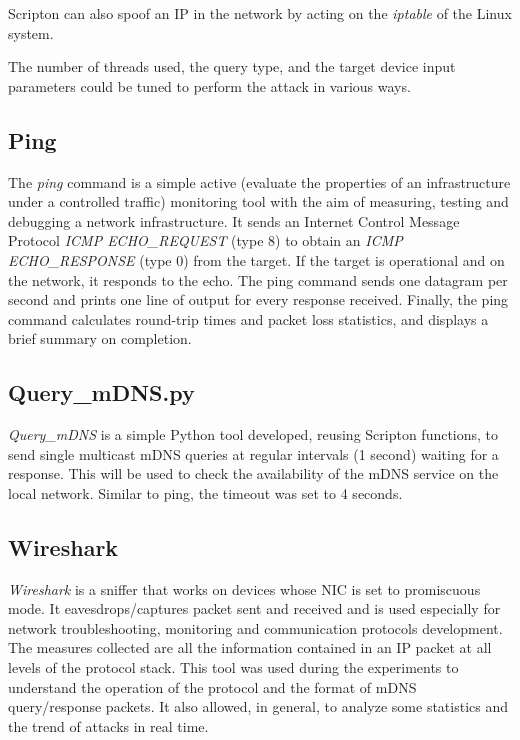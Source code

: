 \documentclass[fleqn, 11pt]{SelfArx} %
\begin{document}
Scripton can also spoof an IP in the network by acting on the \textit{iptable} of the Linux system. \newline

The number of threads used, the query type, and the target device input parameters could be tuned to perform the attack in various ways.

\subsection{Ping}
The \textit {ping} \cite{pingManPage} command is a simple active (evaluate the properties of an infrastructure under a controlled traffic) monitoring tool with the aim of measuring, testing and debugging a network infrastructure. It sends an Internet Control Message Protocol \textit{ICMP ECHO\_REQUEST} (type 8) to obtain an \textit{ICMP ECHO\_RESPONSE} (type 0) from the target. If the target is operational and on the network, it responds to the echo. The ping command sends one datagram per second and prints one line of output for every response received. Finally, the ping command calculates round-trip times and packet loss statistics, and displays a brief summary on completion.

\subsection{Query\_mDNS.py}
\label{sec:query-mdns-script}
\textit{Query\_mDNS} is a simple Python tool developed, reusing Scripton functions, to send single multicast mDNS queries at regular intervals (1 second) waiting for a response. This will be used to check the availability of the mDNS service on the local network.\newline
Similar to ping, the timeout was set to 4 seconds.

\subsection{Wireshark}
\textit{Wireshark} is a sniffer that works on devices whose NIC is set to promiscuous mode. It eavesdrops/captures packet sent and received and is used especially for network troubleshooting, monitoring and communication protocols development. The measures collected are all the information contained in an IP packet at all levels of the protocol stack. \newline
This tool was used during the experiments to understand the operation of the protocol and the format of mDNS query/response packets. \newline
It also allowed, in general, to analyze some statistics and the trend of attacks in real time.
\end{document}
